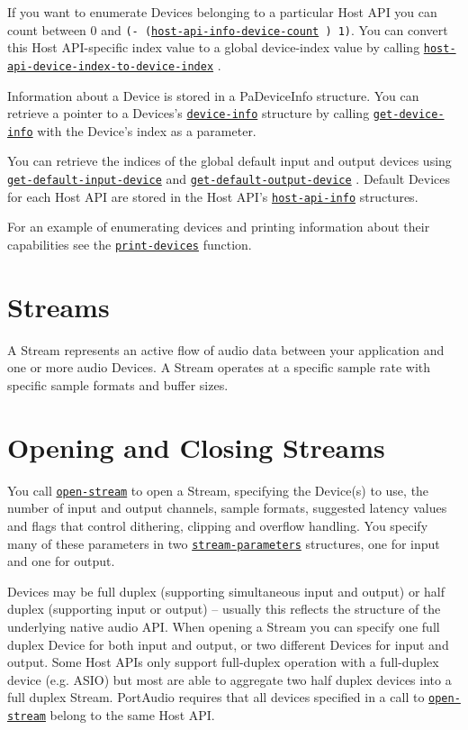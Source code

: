 \documentclass[a4paper]{report}
\begin{document}
If you want to enumerate Devices belonging to a particular Host API you can count between 0 and \texttt{(- (\hyperref[portaudio__fun__host-api-info-device-count]{\texttt{host-api-info-device-count}}
  ) 1)}. You can convert this Host API-specific index value to a global device-index value by calling \hyperref[portaudio__fun__host-api-device-index-to-device-index]{\texttt{host-api-device-index-to-device-index}}
  .

Information about a Device is stored in a PaDeviceInfo structure. You can retrieve a pointer to a Devices's \hyperref[portaudio__class__device-info]{\texttt{device-info}}
   structure by calling \hyperref[portaudio__fun__get-device-info]{\texttt{get-device-info}}
   with the Device's index as a parameter.

You can retrieve the indices of the global default input and output devices using \hyperref[portaudio__fun__get-default-input-device]{\texttt{get-default-input-device}}
   and \hyperref[portaudio__fun__get-default-output-device]{\texttt{get-default-output-device}}
  . Default Devices for each Host API are stored in the Host API's \hyperref[portaudio__class__host-api-info]{\texttt{host-api-info}}
   structures.

For an example of enumerating devices and printing information about their capabilities see the \hyperref[portaudio__fun__print-devices]{\texttt{print-devices}}
   function.\section{Streams} \label{d0d0e0e0e0e7}
A Stream represents an active flow of audio data between your application and one or more audio Devices. A Stream operates at a specific sample rate with specific sample formats and buffer sizes.\section{Opening and Closing Streams} \label{d0d0e0e0e0e8}You call \hyperref[portaudio__fun__open-stream]{\texttt{open-stream}}
   to open a Stream, specifying the Device(s) to use, the number of input and output channels, sample formats, suggested latency values and flags that control dithering, clipping and overflow handling. You specify many of these parameters in two \hyperref[portaudio__class__stream-parameters]{\texttt{stream-parameters}}
   structures, one for input and one for output.

Devices may be full duplex (supporting simultaneous input and output) or half duplex (supporting input or output) – usually this reflects the structure of the underlying native audio API. When opening a Stream you can specify one full duplex Device for both input and output, or two different Devices for input and output. Some Host APIs only support full-duplex operation with a full-duplex device (e.g. ASIO) but most are able to aggregate two half duplex devices into a full duplex Stream. PortAudio requires that all devices specified in a call to \hyperref[portaudio__fun__open-stream]{\texttt{open-stream}}
   belong to the same Host API.
\end{document}
